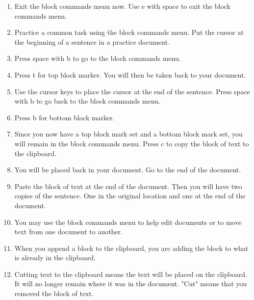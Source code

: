 \documentclass[10pt,letterpaper,twoside]{report}
\begin{document}
{{{{\begin{enumerate}
\begin{enumerate}
		      \item Grade, correct grade of block
		            
		            
	      \end{enumerate}
	\item Exit the block commands menu now.  Use e with space to exit the block commands menu.
	      
	\item Practice a common task using the block commands menu.  Put the cursor at the beginning of a sentence in a practice document.
	      
	\item Press space with b to go to the block commands menu.
	      
	\item Press t for top block marker.  You will then be taken back to your document.
	      
	\item Use the cursor keys to place the cursor at the end of the sentence.  Press space with b to go back to the block commands menu.
	      
	\item Press b for bottom block marker.
	      
	\item Since you now have a top block mark set and a bottom block mark set, you will remain in the block commands menu.  Press c to copy the block of text to the clipboard.
	      
	\item You will be placed back in your document.  Go to the end of the document.
	      
	\item Paste the block of text at the end of the document.  Then you will have two copies of the sentence.  One in the original location and one at the end of the document.
	      
	\item You may use the block commands menu to help edit documents or to move text from one document to another.
	      
	\item When you append a block to the clipboard, you are adding the block to what is already in the clipboard.
	      
	\item Cutting text to the clipboard means the text will be placed on the clipboard.  It will no longer remain where it was in the document.  "Cut" means that you removed the block of text.
	      

\end{enumerate}}}}}
\end{document}

